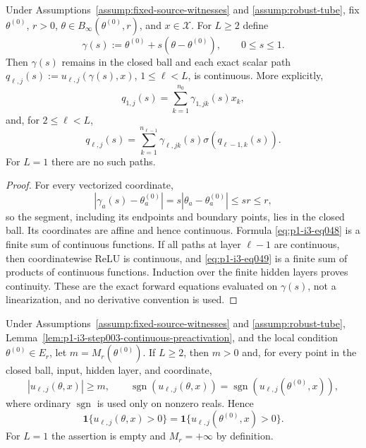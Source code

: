 \begin{lemma}
\label{lem:p1-i3-step003-continuous-preactivation}
Under Assumptions~\ref{assump:fixed-source-witnesses} and
\ref{assump:robust-tube}, fix $\theta^{(0)}$, $r>0$,
$\theta\in B_\infty(\theta^{(0)},r)$, and $x\in\mathcal X$.  For $L\geq2$
define
\[
\gamma(s):=\theta^{(0)}+s(\theta-\theta^{(0)}),
\qquad0\leq s\leq1.
\tag{47}\label{eq:p1-i3-eq047}
\]
Then $\gamma(s)$ remains in the closed ball and each exact scalar path
$q_{\ell,j}(s):=u_{\ell,j}(\gamma(s),x)$, $1\leq\ell<L$, is continuous.
More explicitly,
\[
q_{1,j}(s)=\sum_{k=1}^{n_0}\gamma_{1,jk}(s)x_k,
\tag{48}\label{eq:p1-i3-eq048}
\]
and, for $2\leq\ell<L$,
\[
q_{\ell,j}(s)=\sum_{k=1}^{n_{\ell-1}}
\gamma_{\ell,jk}(s)\sigma(q_{\ell-1,k}(s)).
\tag{49}\label{eq:p1-i3-eq049}
\]
For $L=1$ there are no such paths.
\end{lemma}

\begin{proof}
For every vectorized coordinate,
\[
|\gamma_a(s)-\theta^{(0)}_a|
=s|\theta_a-\theta^{(0)}_a|\leq sr\leq r,
\tag{50}\label{eq:p1-i3-eq050}
\]
so the segment, including its endpoints and boundary points, lies in the
closed ball.  Its coordinates are affine and hence continuous.  Formula
\eqref{eq:p1-i3-eq048} is a finite sum of continuous functions.  If all paths at layer
$\ell-1$ are continuous, then coordinatewise ReLU is continuous, and \eqref{eq:p1-i3-eq049} is
a finite sum of products of continuous functions.  Induction over the finite
hidden layers proves continuity.  These are the exact forward equations
evaluated on $\gamma(s)$, not a linearization, and no derivative convention is
used.
\end{proof}

\begin{proposition}
\label{prop:p1-i3-step003-ball-gates}
Under Assumptions~\ref{assump:fixed-source-witnesses} and
\ref{assump:robust-tube}, Lemma~\ref{lem:p1-i3-step003-continuous-preactivation},
and the local condition $\theta^{(0)}\in E_r$, let
$m=M_r(\theta^{(0)})$.  If $L\geq2$, then $m>0$ and, for every point in the
closed ball, input, hidden layer, and coordinate,
\[
|u_{\ell,j}(\theta,x)|\geq m,
\qquad
\operatorname{sgn}(u_{\ell,j}(\theta,x))
=\operatorname{sgn}(u_{\ell,j}(\theta^{(0)},x)),
\tag{51}\label{eq:p1-i3-eq051}
\]
where ordinary $\operatorname{sgn}$ is used only on nonzero reals.  Hence
\[
\mathbf1\{u_{\ell,j}(\theta,x)>0\}
=\mathbf1\{u_{\ell,j}(\theta^{(0)},x)>0\}.
\tag{52}\label{eq:p1-i3-eq052}
\]
For $L=1$ the assertion is empty and $M_r=+\infty$ by definition.
\end{proposition}

